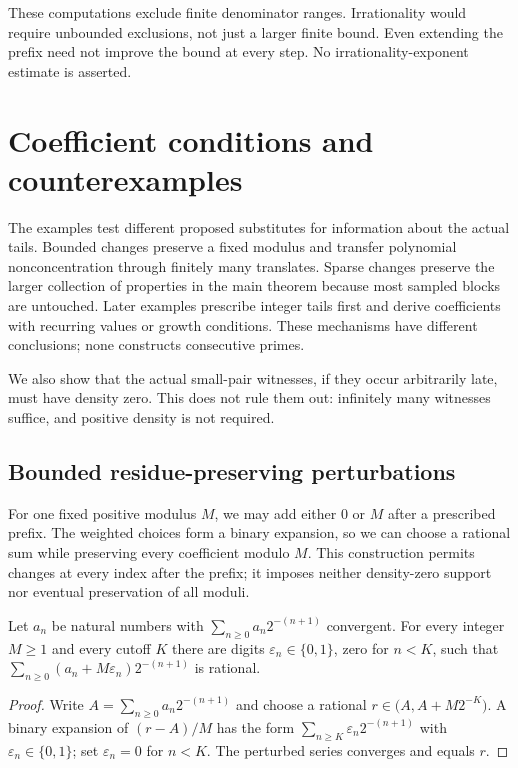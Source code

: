 These computations exclude finite denominator ranges.  Irrationality
would require unbounded exclusions, not just a larger finite bound.
Even extending the prefix need not improve the bound at every step.
No irrationality-exponent estimate is asserted.

\section{Coefficient conditions and counterexamples}\label{long251:sec:obstructions}

The examples test different proposed substitutes for information about
the actual tails.  Bounded changes preserve a fixed modulus and transfer
polynomial nonconcentration through finitely many translates.  Sparse
changes preserve the larger collection of properties in the main theorem
because most sampled blocks are untouched.  Later examples prescribe
integer tails first and derive coefficients with recurring values or
growth conditions.  These mechanisms have different conclusions; none
constructs consecutive primes.

We also show that the actual small-pair witnesses, if they occur
arbitrarily late, must have density zero.  This does not rule them out:
infinitely many witnesses suffice, and positive density is not required.

\subsection{Bounded residue-preserving perturbations}

For one fixed positive modulus $M$, we may add either $0$ or $M$
after a prescribed prefix.  The weighted choices form a binary expansion,
so we can choose a rational sum while preserving every coefficient
modulo $M$.  This construction permits changes at every index after the
prefix; it imposes neither density-zero support nor eventual preservation
of all moduli.

\begin{theorem}\label{long251:res:boundedperturbation}
Let $a_n$ be natural numbers with $\sum_{n\ge0}a_n2^{-(n+1)}$ convergent.  For
every integer $M\ge1$ and every cutoff $K$ there are digits
$\varepsilon_n\in\{0,1\}$, zero for $n<K$, such that
$\sum_{n\ge0}(a_n+M\varepsilon_n)2^{-(n+1)}$ is rational.
\end{theorem}

\begin{proof}
Write $A=\sum_{n\ge0}a_n2^{-(n+1)}$ and choose a rational
$r\in\bigl(A,A+M2^{-K}\bigr)$.  A binary expansion of $(r-A)/M$ has the form
$\sum_{n\ge K}\varepsilon_n2^{-(n+1)}$ with $\varepsilon_n\in\{0,1\}$; set
$\varepsilon_n=0$ for $n<K$.  The perturbed series converges and equals $r$.
\end{proof}

